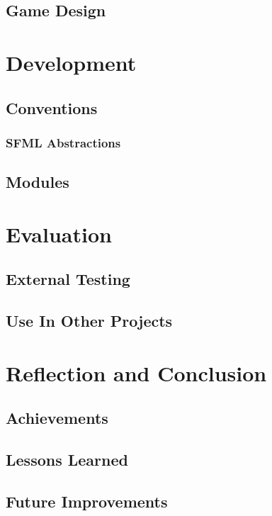 \documentclass[]{report}
\begin{document}
	\section{Game Design}


\chapter{Development}
	\section{Conventions}
		\subsection{SFML Abstractions}
	\section{Modules}
	

\chapter{Evaluation}
	\section{External Testing}
	\section{Use In Other Projects}
	

\chapter{Reflection and Conclusion}
	\section{Achievements}
	\section{Lessons Learned}
	\section{Future Improvements}
\end{document}
